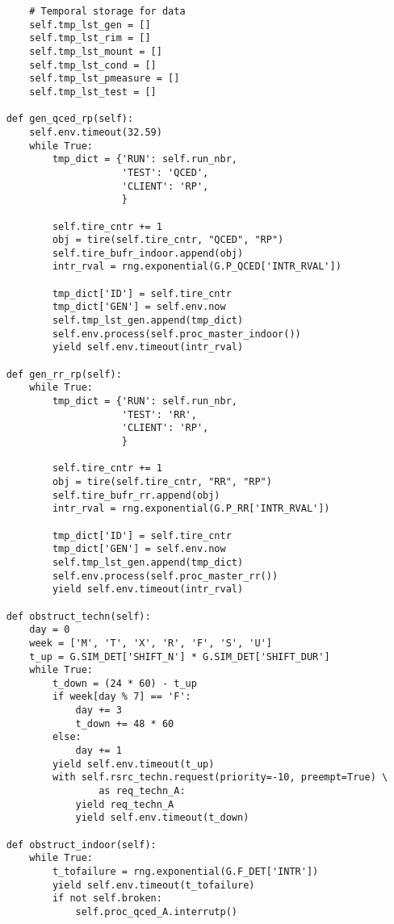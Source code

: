 \begin{verbatim}
        # Temporal storage for data
        self.tmp_lst_gen = []
        self.tmp_lst_rim = []
        self.tmp_lst_mount = []
        self.tmp_lst_cond = []
        self.tmp_lst_pmeasure = []
        self.tmp_lst_test = []

    def gen_qced_rp(self):
        self.env.timeout(32.59)
        while True:
            tmp_dict = {'RUN': self.run_nbr,
                        'TEST': 'QCED',
                        'CLIENT': 'RP',
                        }

            self.tire_cntr += 1
            obj = tire(self.tire_cntr, "QCED", "RP")
            self.tire_bufr_indoor.append(obj)
            intr_rval = rng.exponential(G.P_QCED['INTR_RVAL'])

            tmp_dict['ID'] = self.tire_cntr
            tmp_dict['GEN'] = self.env.now
            self.tmp_lst_gen.append(tmp_dict)
            self.env.process(self.proc_master_indoor())
            yield self.env.timeout(intr_rval)

    def gen_rr_rp(self):
        while True:
            tmp_dict = {'RUN': self.run_nbr,
                        'TEST': 'RR',
                        'CLIENT': 'RP',
                        }

            self.tire_cntr += 1
            obj = tire(self.tire_cntr, "RR", "RP")
            self.tire_bufr_rr.append(obj)
            intr_rval = rng.exponential(G.P_RR['INTR_RVAL'])

            tmp_dict['ID'] = self.tire_cntr
            tmp_dict['GEN'] = self.env.now
            self.tmp_lst_gen.append(tmp_dict)
            self.env.process(self.proc_master_rr())
            yield self.env.timeout(intr_rval)

    def obstruct_techn(self):
        day = 0
        week = ['M', 'T', 'X', 'R', 'F', 'S', 'U']
        t_up = G.SIM_DET['SHIFT_N'] * G.SIM_DET['SHIFT_DUR']
        while True:
            t_down = (24 * 60) - t_up
            if week[day % 7] == 'F':
                day += 3
                t_down += 48 * 60
            else:
                day += 1
            yield self.env.timeout(t_up)
            with self.rsrc_techn.request(priority=-10, preempt=True) \
                    as req_techn_A:
                yield req_techn_A
                yield self.env.timeout(t_down)

    def obstruct_indoor(self):
        while True:
            t_tofailure = rng.exponential(G.F_DET['INTR'])
            yield self.env.timeout(t_tofailure)
            if not self.broken:
                self.proc_qced_A.interrutp()


\end{verbatim}
